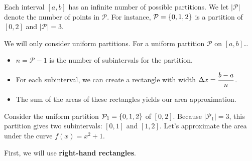 \documentclass[12pt]{article}
\begin{document}

\vspace{5mm}

Each interval $[a,b]$ has an infinite number of possible partitions. We let $\big|\mathcal{P}\big|$ denote the number of points in $\mathcal{P}$. For instance, $\mathcal{P}=\left\{ 0, 1, 2\right\}$ is a partition of $[0,2]$ and $\big|\mathcal{P}\big|=3$.

\vspace{5mm}


\vspace{5mm}

We will only consider uniform partitions. For a uniform partition $\mathcal{P}$ on $[a,b]$\dots
\begin{itemize}
	\item $n=\mathcal{P}-1$ is the number of subintervals for the partition.
	\item For each subinterval, we can create a rectangle with width $\Delta x=\displaystyle\frac{b-a}{n}$.
	\item The sum of the areas of these rectangles yields our area approximation.
	
	\vspace{20mm}
\end{itemize}

\newpage

\Example Consider the uniform partition $\mathcal{P}_1=\left\{ 0,1,2\right\}$ of $[0,2]$. Because $\big|\mathcal{P}_1\big|=3$, this partition gives two subintervals: $[0,1]$ and $[1,2]$. Let's approximate the area under the curve $f(x)=x^2+1$.

\vspace{5mm}

First, we will use \textbf{right-hand rectangles}.

\vspace{3mm}
\end{document}
